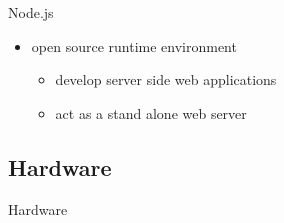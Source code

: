\begin{frame}{Node.js}

  \begin{itemize}
    \item open source runtime environment
    \begin{itemize}
        \item develop server side web applications
        \item act as a stand alone web server
    \end{itemize}

  \end{itemize}

  \begin{figure}[htb]
    \centering
    \nocite{nodejs:logo}
  \end{figure}

\end{frame}

\subsection{Hardware}
\begin{frame}{Hardware}

\end{frame}
